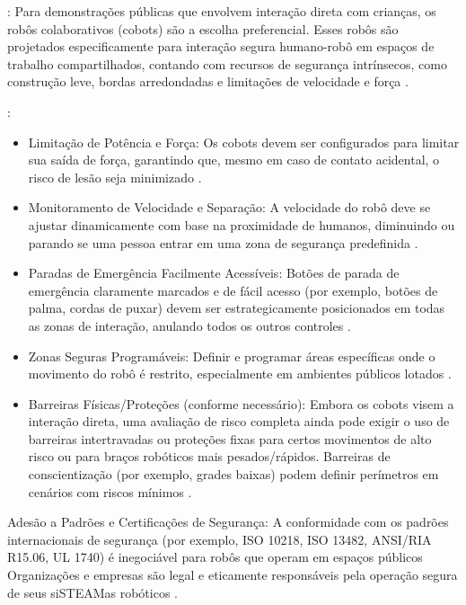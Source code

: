 \documentclass[%
  12pt,%
  a4paper,%
  oneside,%
  openright,%
  sumario = abnt-6027-2012,%
  chapter = TITLE,%
  pretextualoneside,%
  fontetimes,%
  semrecuonosumario,%
  usemakeindex,%
  pardeassinaturas,%
  english,%
  french,%
  spanish,%
  brazil,%
]{utfpr}%
\begin{document}
	\begin{description}
		\item [Priorizar Robôs Colaborativos (Cobots)]: Para demonstrações públicas que envolvem interação direta com crianças, os robôs colaborativos (cobots) são a escolha preferencial. Esses robôs são projetados especificamente para interação segura humano-robô em espaços de trabalho compartilhados, contando com recursos de segurança intrínsecos, como construção leve, bordas arredondadas e limitações de velocidade e força \cite{top3dshopDobotMagicianReview2023}.
		
		\item [Implementar Recursos Essenciais de Segurança]:
			\begin{itemize}
				\item Limitação de Potência e Força: Os cobots devem ser configurados para limitar sua saída de força, garantindo que, mesmo em caso de contato acidental, o risco de lesão seja minimizado \cite{wikipediaCobot2025}.
				\item Monitoramento de Velocidade e Separação: A velocidade do robô deve se ajustar dinamicamente com base na proximidade de humanos, diminuindo ou parando se uma pessoa entrar em uma zona de segurança predefinida \cite{wikipediaCobot2025}.
				\item Paradas de Emergência Facilmente Acessíveis: Botões de parada de emergência claramente marcados e de fácil acesso (por exemplo, botões de palma, cordas de puxar) devem ser estrategicamente posicionados em todas as zonas de interação, anulando todos os outros controles \cite{kinovaJacoAssistiveTechnologies2025}.
				\item Zonas Seguras Programáveis: Definir e programar áreas específicas onde o movimento do robô é restrito, especialmente em ambientes públicos lotados \cite{teradyneCollaborativeRobots2025}.
				\item Barreiras Físicas/Proteções (conforme necessário): Embora os cobots visem a interação direta, uma avaliação de risco completa ainda pode exigir o uso de barreiras intertravadas ou proteções fixas para certos movimentos de alto risco ou para braços robóticos mais pesados/rápidos. Barreiras de conscientização (por exemplo, grades baixas) podem definir perímetros em cenários com riscos mínimos \cite{kinovaJacoAssistiveTechnologies2025}.
			\end{itemize}
		\item Adesão a Padrões e Certificações de Segurança: A conformidade com os padrões internacionais de segurança (por exemplo, ISO 10218, ISO 13482, ANSI/RIA R15.06, UL 1740) é inegociável para robôs que operam em espaços públicos \cite{standardBotsCobotSafetyStandards2025} Organizações e empresas são legal e eticamente responsáveis pela operação segura de seus siSTEAMas robóticos \cite{li2023LowCostCableDrivenArm}.

\end{description}
\end{document}
